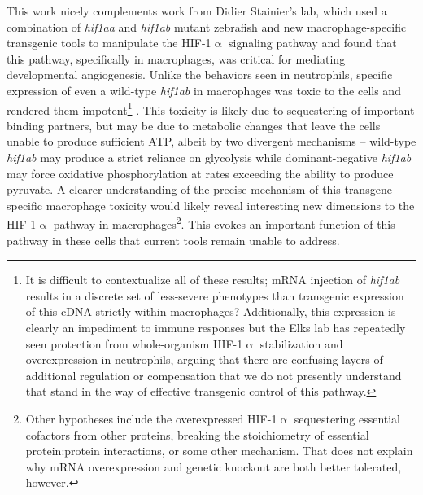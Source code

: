 This work nicely complements work from Didier Stainier's lab, which used a combination of \textit{hif1aa} and \textit{hif1ab} mutant zebrafish and new macrophage\hyp{}specific transgenic tools to manipulate the HIF\hyp{}1$\upalpha$ signaling pathway and found that this pathway, specifically in macrophages, was critical for mediating developmental angiogenesis. Unlike the behaviors seen in neutrophils, specific expression of even a wild\hyp{}type \textit{hif1ab} in macrophages was toxic to the cells and rendered them impotent\footnote{It is difficult to contextualize all of these results; mRNA injection of \textit{hif1ab} results in a discrete set of less\hyp{}severe phenotypes than transgenic expression of this cDNA strictly within macrophages? Additionally, this expression is clearly an impediment to immune responses but the Elks lab has repeatedly seen protection from whole\hyp{}organism HIF\hyp{}1$\upalpha$ stabilization and overexpression in neutrophils, arguing that there are confusing layers of additional regulation or compensation that we do not presently understand that stand in the way of effective transgenic control of this pathway.} \citep{Gerri2017}. This toxicity is likely due to sequestering of important binding partners, but may be due to metabolic changes that leave the cells unable to produce sufficient ATP, albeit by two divergent mechanisms -- wild\hyp{}type \textit{hif1ab} may produce a strict reliance on glycolysis while dominant\hyp{}negative \textit{hif1ab} may force oxidative phosphorylation at rates exceeding the ability to produce pyruvate. A clearer understanding of the precise mechanism of this transgene\hyp{}specific macrophage toxicity would likely reveal interesting new dimensions to the HIF\hyp{}1$\upalpha$ pathway in macrophages\footnote{Other hypotheses include the overexpressed HIF\hyp{}1$\upalpha$ sequestering essential cofactors from other proteins, breaking the stoichiometry of essential protein:protein interactions, or some other mechanism. That does not explain why mRNA overexpression and genetic knockout are both better tolerated, however.}. This evokes an important function of this pathway in these cells that current tools remain unable to address. 

